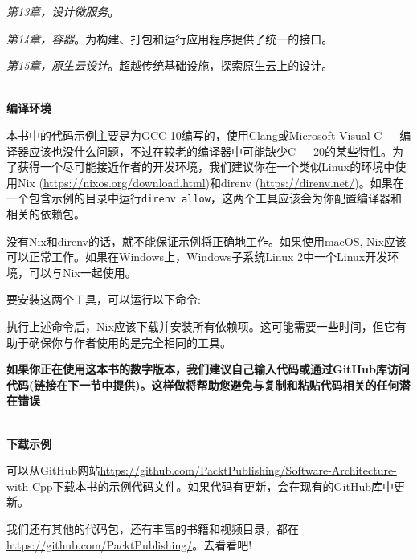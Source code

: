 \textit{第13章，设计微服务}。

\textit{第14章，容器}。为构建、打包和运行应用程序提供了统一的接口。

\textit{第15章，原生云设计}。超越传统基础设施，探索原生云上的设计。

\hspace*{\fill} \\ %
\textbf{编译环境}

本书中的代码示例主要是为GCC 10编写的，使用Clang或Microsoft Visual C++编译器应该也没什么问题，不过在较老的编译器中可能缺少C++20的某些特性。为了获得一个尽可能接近作者的开发环境，我们建议你在一个类似Linux的环境中使用Nix (\url{https://nixos.org/download.html})和direnv (\url{https://direnv.net/})。如果在一个包含示例的目录中运行\texttt{direnv allow}，这两个工具应该会为你配置编译器和相关的依赖包。

没有Nix和direnv的话，就不能保证示例将正确地工作。如果使用macOS, Nix应该可以正常工作。如果在Windows上，Windows子系统Linux 2中一个Linux开发环境，可以与Nix一起使用。

要安装这两个工具，可以运行以下命令:


执行上述命令后，Nix应该下载并安装所有依赖项。这可能需要一些时间，但它有助于确保你与作者使用的是完全相同的工具。

\textbf{如果你正在使用这本书的数字版本，我们建议自己输入代码或通过GitHub库访问代码(链接在下一节中提供)。这样做将帮助您避免与复制和粘贴代码相关的任何潜在错误}

\hspace*{\fill} \\ %
\textbf{下载示例}

可以从GitHub网站\url{https://github.com/PacktPublishing/Software-Architecture-with-Cpp}下载本书的示例代码文件。如果代码有更新，会在现有的GitHub库中更新。

我们还有其他的代码包，还有丰富的书籍和视频目录，都在\url{https://github.com/PacktPublishing/}。去看看吧!

